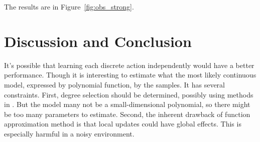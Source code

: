 \documentclass[10pt]{IEEEtran}
\begin{document}
The results are in Figure~\ref{fig:obs_strong}.

\section{Discussion and Conclusion}
\label{sec:dis}

It's possible that learning each discrete action independently would
have a better performance. Though it is interesting to estimate what
the most likely continuous model, expressed by polynomial function, by
the samples. It has several constraints. First, degree selection
should be determined, possibly using methods in
\cite{IJAIT08-stronger}. But the model many not be a small-dimensional
polynomial, so there might be too many parameters to estimate. Second,
the inherent drawback of function approximation method is that local
updates could have global effects. This is especially harmful in a
noisy environment.




\end{document}
